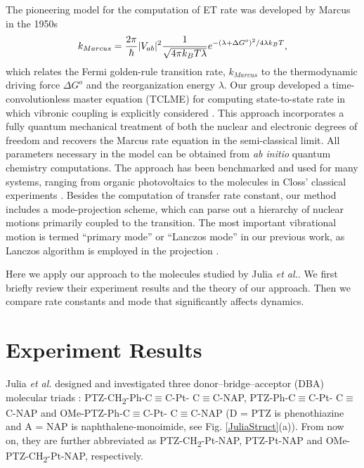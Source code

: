 The pioneering model for the computation of ET rate was developed by Marcus in the 1950s \cite{marcus1956theory,marcus1965theory,marcus1993electron}
\begin{equation}
k_{Marcus}=\frac{2\pi}{\hbar}|V_{ab}|^{2}\frac{1}{\sqrt{4\text{\ensuremath{\pi}}k_{B}T\lambda}}e^{-(\lambda+ \Delta G^{o})^{2}/4\text{\ensuremath{\lambda}}k_{B}T},
\end{equation}
which relates the Fermi golden-rule transition rate, $k_{Marcus}$
to the thermodynamic driving force $\Delta G^{o}$ and the reorganization energy $\lambda$. Our group developed a time-convolutionless  master equation (TCLME) for computing state-to-state rate in which vibronic coupling is explicitly considered \cite{pereverzev2006time}. This approach incorporates a fully quantum
mechanical treatment of both the nuclear and electronic degrees of freedom and recovers
the Marcus rate equation in the semi-classical limit.  All parameters necessary in the model can be obtained from {\em ab initio} quantum  chemistry computations.
The approach has been benchmarked and used for many systems, ranging from organic photovoltaics to the molecules in Closs' classical experiments \cite{tamura2008phonon,tamura2007exciton,singh2009fluorescence,bittner2014noise,yang2014intramolecular,yang2015computing}. Besides the computation of transfer rate constant, our method includes a  mode-projection scheme, which can parse out a hierarchy of nuclear motions primarily coupled to the transition. The most important vibrational motion is termed ``primary mode'' or ``Lanczos mode'' in our previous work, as Lanczos algorithm is employed in the projection \cite{yang2014intramolecular,yang2015computing}.

Here we apply our approach to the molecules studied by Julia {\em et al.}. We first briefly review their experiment results and the theory of our approach. Then we compare  rate constants and mode that significantly affects dynamics.


\section{Experiment Results}

Julia {\em et al.} designed and investigated three donor–bridge–acceptor (DBA) molecular triads \cite{delor2014toward,delor2015mechanism,scattergood2014electron}: PTZ-CH\textsubscript{2}-Ph-C$\equiv$C-Pt- C$\equiv$C-NAP, PTZ-Ph-C$\equiv$C-Pt- C$\equiv$C-NAP and OMe-PTZ-Ph-C$\equiv$C-Pt- C$\equiv$C-NAP (D = PTZ is phenothiazine and A = NAP is naphthalene-monoimide, see Fig. \ref{JuliaStruct}(a)). From now on, they are further abbreviated as PTZ-CH\textsubscript{2}-Pt-NAP, PTZ-Pt-NAP and OMe-PTZ-CH\textsubscript{2}-Pt-NAP, respectively.

